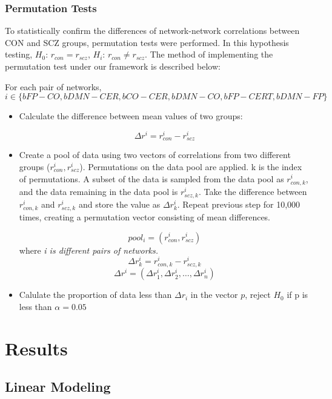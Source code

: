 \documentclass[11pt]{article}
\begin{document}
\subsubsection{Permutation Tests}

To statistically confirm the differences of network-network correlations between CON and SCZ groups, permutation tests were performed. In this hypothesis testing, $H_{0}$: $r_{con} = r_{scz}$, $H_{i}$: $r_{con} \neq r_{scz}$.
The method of implementing the permutation test under our framework is described below:

For each pair of networks, $$i \in \{ bFP-CO, bDMN-CER, bCO-CER, bDMN-CO, bFP-CERT, bDMN-FP \}$$ 
\begin{itemize}
\item Calculate the difference between mean values of two groups:

$$ \Delta r^i =  r_{con}^i - r_{scz}^i $$ 

\item  Create a pool of data using two vectors of correlations from two different groups ($r_{con}^i, r_{scz}^i$). Permutations on the data pool are applied. k is the index of permutations. A subset of the data is sampled from the data pool as $ r_{con, k}^i$, and the data remaining in the data pool is $r_{scz, k}^i$. Take the difference between $ r_{con, k}^i$ and  $r_{scz, k}^i$ and store the value as $\Delta r_{k}^i$. Repeat previous step for 10,000 times, creating a permutation vector consisting of mean differences.

$$ pool_{i} = (r_{con}^i, r_{scz}^i) $$ where \textit{i is different pairs of networks.}
$$ \Delta r_{k}^i = r_{con,k}^i - r_{scz,k}^i $$ 
$$ \Delta r^i = (\Delta r_{1}^i, \Delta r_{2}^i, \dots, \Delta r_{n}^i) $$

\item Calulate the proportion of data less than $\Delta r_{i}$ in the vector $p$, reject $H_0$ if p is less than $\alpha = 0.05$

\end{itemize}

\section{Results}

\subsection{Linear Modeling}
\end{document}
